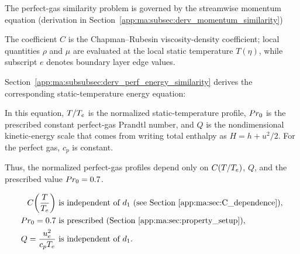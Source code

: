 The perfect-gas similarity problem is governed by the streamwise momentum equation (derivation in Section~\ref{app:ma:subsec:derv_momentum_similarity})


The coefficient \(C\) is the Chapman--Rubesin viscosity-density coefficient; local quantities \(\rho\) and \(\mu\) are evaluated at the local static temperature \(T(\eta)\), while subscript \(e\) denotes boundary layer edge values.

Section~\ref{app:ma:subsubsec:derv_perf_energy_similarity} derives the corresponding static-temperature energy equation:


In this equation, \(T/T_e\) is the normalized static-temperature profile, \(Pr_0\) is the prescribed constant perfect-gas Prandtl number, and \(Q\) is the nondimensional kinetic-energy scale that comes from writing total enthalpy as \(H=h+u^2/2\). For the perfect gas, \(c_p\) is constant.

Thus, the normalized perfect-gas profiles depend only on \(C(T/T_e)\), \(Q\), and the prescribed value \(Pr_0=0.7\).

\begin{equation}
  \begin{aligned}
    C\!\left(\frac{T}{T_e}\right) &\ \text{is independent of } d_1 \text{ (see Section~\ref{app:ma:sec:C_dependence})},\\
    Pr_0=0.7 &\ \text{is prescribed (Section~\ref{app:ma:sec:property_setup})},\\
    Q=\frac{u_e^2}{c_pT_e} &\ \text{is independent of }d_1.
  \end{aligned}
  \label{app:ma:eq:pgindependent}
\end{equation}


